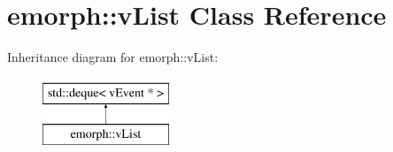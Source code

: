 \hypertarget{classemorph_1_1vList}{\section{emorph\-:\-:v\-List Class Reference}
\label{classemorph_1_1vList}
}
Inheritance diagram for emorph\-:\-:v\-List\-:\begin{figure}[H]
\begin{center}
\leavevmode
\includegraphics[height=2.000000cm]{classemorph_1_1vList}
\end{center}
\end{figure}
